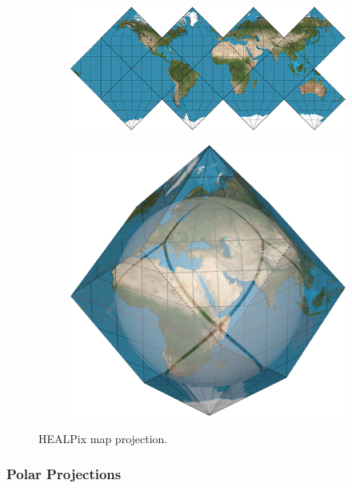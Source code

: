 \begin{figure}[htbp]
    \centering
    \begin{subfigure}[bt]{0.5\textwidth}
        \includegraphics[width=\textwidth]{figures/developable_projected/healpix.png}
    \end{subfigure}
    \qquad
    \begin{subfigure}[bt]{0.2\textwidth}
        \includegraphics[width=\textwidth]{figures/map_projection/projection_healpix.png}
    \end{subfigure}
    \caption{HEALPix map projection.}
    \label{fig:proj_healpix}
\end{figure}

\subsubsection{Polar Projections}

